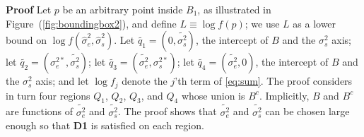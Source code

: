 \documentclass{report}
\newcommand{\RL}{f}
\newcommand{\logRL}{\log\RL}
\newcommand{\sigssq}{\sigma_s^2}
\newcommand{\sigesq}{\sigma_e^2}
\newcommand{\sshat}{\hat\sigma^2_e,\hat\sigma^2_s}
\begin{document}
%
\noindent\textbf{Proof}
Let $p$ be an arbitrary point inside $B_1$, as illustrated in Figure~(\ref{fig:boundingbox2}), and define $L \equiv \logRL(p)$; we use $L$ as a lower bound on $\logRL(\sshat)$.  Let $\widetilde{q_1} = (0,\widetilde{\sigma_s^2})$, the intercept of $B$ and the $\sigssq$ axis; let $\widetilde{q_2} = (\sigma_e^{2*},\widetilde{\sigma_s^2})$; let $\widetilde{q_3} = (\widetilde{\sigma_e^2}, \sigma_s^{2*})$; let $\widetilde{q_4} = (\widetilde{\sigma_e^2},0)$, the intercept of $B$ and the $\sigssq$ axis; and let $\logRL_j$ denote the $j$'th term of \eqref{eq:sum}.  The proof considers in turn four regions $Q_1$, $Q_2$, $Q_3$, and $Q_4$ whose union is $B^c$.  Implicitly, $B$ and $B^c$ are functions of $\widetilde{\sigma_e^2}$ and $\widetilde{\sigma_s^2}$.  The proof shows that $\widetilde{\sigma_e^2}$ and $\widetilde{\sigma_s^2}$ can be chosen large enough so that \textbf{D1} is satisfied on each region.  
\end{document}
